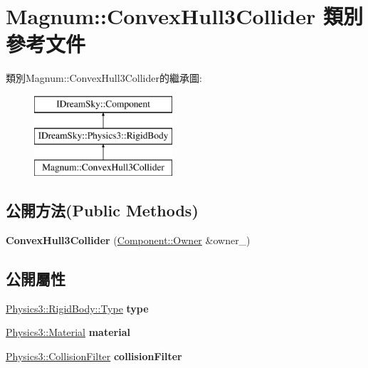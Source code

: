 \hypertarget{class_magnum_1_1_convex_hull3_collider}{}\section{Magnum\+:\+:Convex\+Hull3\+Collider 類別 參考文件}
\label{class_magnum_1_1_convex_hull3_collider}
類別\+Magnum\+:\+:Convex\+Hull3\+Collider的繼承圖\+:\begin{figure}[H]
\begin{center}
\leavevmode
\includegraphics[height=3.000000cm]{class_magnum_1_1_convex_hull3_collider}
\end{center}
\end{figure}
\subsection*{公開方法(Public Methods)}
\begin{DoxyCompactItemize}
\item 
{\bfseries Convex\+Hull3\+Collider} (\hyperlink{class_i_dream_sky_1_1_component_1_1_owner}{Component\+::\+Owner} \&owner\+\_\+)\hypertarget{class_magnum_1_1_convex_hull3_collider_abf85df7f61c3ad59fb65e7bc5eca0447}{}\label{class_magnum_1_1_convex_hull3_collider_abf85df7f61c3ad59fb65e7bc5eca0447}

\end{DoxyCompactItemize}
\subsection*{公開屬性}
\begin{DoxyCompactItemize}
\item 
\hyperlink{class_i_dream_sky_1_1_physics3_1_1_rigid_body_a8a970d66442558ce0a3ce7b8009c14fa}{Physics3\+::\+Rigid\+Body\+::\+Type} {\bfseries type}\hypertarget{class_magnum_1_1_convex_hull3_collider_a47968cc9d28644c505e933ecb6a98c39}{}\label{class_magnum_1_1_convex_hull3_collider_a47968cc9d28644c505e933ecb6a98c39}

\item 
\hyperlink{class_i_dream_sky_1_1_physics3_1_1_material}{Physics3\+::\+Material} {\bfseries material}\hypertarget{class_magnum_1_1_convex_hull3_collider_a23a5c9dfec30e1ae825cd2194657998a}{}\label{class_magnum_1_1_convex_hull3_collider_a23a5c9dfec30e1ae825cd2194657998a}

\item 
\hyperlink{class_i_dream_sky_1_1_physics3_1_1_collision_filter}{Physics3\+::\+Collision\+Filter} {\bfseries collision\+Filter}\hypertarget{class_magnum_1_1_convex_hull3_collider_a02da903dce8d574abf6241ff61fd9e90}{}\label{class_magnum_1_1_convex_hull3_collider_a02da903dce8d574abf6241ff61fd9e90}

\end{DoxyCompactItemize}
